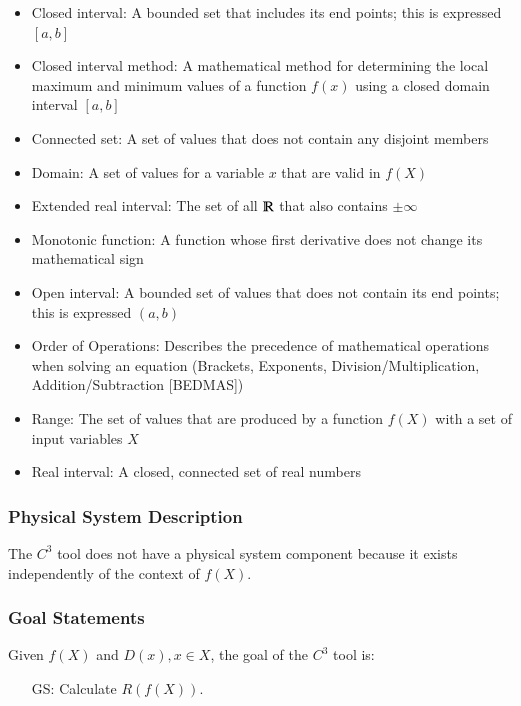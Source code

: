 \documentclass[12pt]{article}
\newcounter{goalnum} %
\newcommand{\prognameAbbrv}{$C^{3}$}
\begin{document}
\begin{itemize}

\item Closed interval: A bounded set that includes its end points; this is 
expressed $[a,b]$
\item Closed interval method: A mathematical method for determining the local 
maximum and minimum values of a function $f(x)$ using a closed domain interval 
$[a,b]$
\item Connected set: A set of values that does not contain any disjoint members
\item Domain: A set of values for a variable $x$ that are valid in $f(X)$
\item Extended real interval: The set of all $\varmathbb{R}$ that also contains 
$\pm \infty$
\item Monotonic function: A function whose first derivative does not change its 
mathematical sign
\item Open interval: A bounded set of values that does not contain its end 
points; this is expressed $(a,b)$
\item Order of Operations: Describes the precedence of mathematical operations 
when solving an equation (Brackets, Exponents, Division/Multiplication, 
Addition/Subtraction [BEDMAS])
\item Range: The set of values that are produced by a function $f(X)$ with a 
set of input variables $X$
\item Real interval: A closed, connected set of real numbers

\end{itemize}

\subsubsection{Physical System Description}

The \prognameAbbrv{} tool does not have a physical system component because it 
exists independently of the context of $f(X)$. 

\subsubsection{Goal Statements}

\noindent Given $f(X)$ and $D(x), x \in X$, the goal of the \prognameAbbrv{} 
tool is:

\begin{itemize}

\item[GS\refstepcounter{goalnum}\thegoalnum \label{G_range}:] 
Calculate $R(f(X))$.



\end{itemize}
\end{document}
